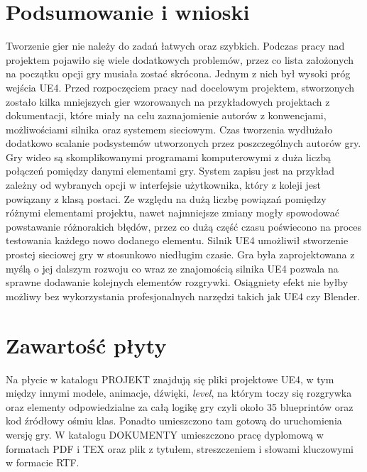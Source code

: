 \documentclass[multip]{SGGW-thesis}
\begin{document}
\chapter{Podsumowanie i wnioski}
Tworzenie gier nie należy do zadań łatwych oraz szybkich. Podczas pracy nad projektem pojawiło się wiele dodatkowych problemów, przez co lista założonych na początku opcji gry musiała zostać skrócona. Jednym z nich był wysoki próg wejścia UE4. Przed rozpoczęciem pracy nad docelowym projektem, stworzonych zostało kilka mniejszych gier wzorowanych na przykładowych projektach z dokumentacji\cite{docs-tutorials}, które miały na celu zaznajomienie autorów z konwencjami, możliwościami silnika oraz systemem sieciowym. Czas tworzenia wydłużało dodatkowo scalanie podsystemów utworzonych przez poszczególnych autorów gry. Gry wideo są skomplikowanymi programami komputerowymi z duża liczbą połączeń pomiędzy danymi elementami gry. System zapisu jest na przykład zależny od wybranych opcji w interfejsie użytkownika, który z koleji jest powiązany z klasą postaci. Ze względu na dużą liczbę powiązań pomiędzy różnymi elementami projektu, nawet najmniejsze zmiany mogły spowodować powstawanie różnorakich błędów, przez co dużą część czasu poświecono na proces testowania każdego nowo dodanego elementu.
\newline \indent Silnik UE4 umożliwił stworzenie prostej sieciowej gry w stosunkowo niedługim czasie. Gra była zaprojektowana z myślą o jej dalszym rozwoju co wraz ze znajomością silnika UE4 pozwala na  sprawne dodawanie kolejnych elementów rozgrywki. Osiągniety efekt nie byłby możliwy bez wykorzystania profesjonalnych narzędzi takich jak UE4 czy Blender.
 \chapter{Zawartość płyty}
Na płycie w katalogu PROJEKT znajdują się pliki projektowe UE4, w tym między innymi modele, animacje, dźwięki, {\em level}, na którym toczy się rozgrywka oraz elementy odpowiedzialne za całą logikę gry czyli około 35 blueprintów oraz kod źródłowy ośmiu klas. Ponadto umieszczono tam gotową do uruchomienia wersję gry.
\newline \indent W katalogu DOKUMENTY umieszczono pracę dyplomową w formatach PDF i TEX oraz plik z tytułem, streszczeniem i słowami kluczowymi w formacie RTF. 
\end{document}
